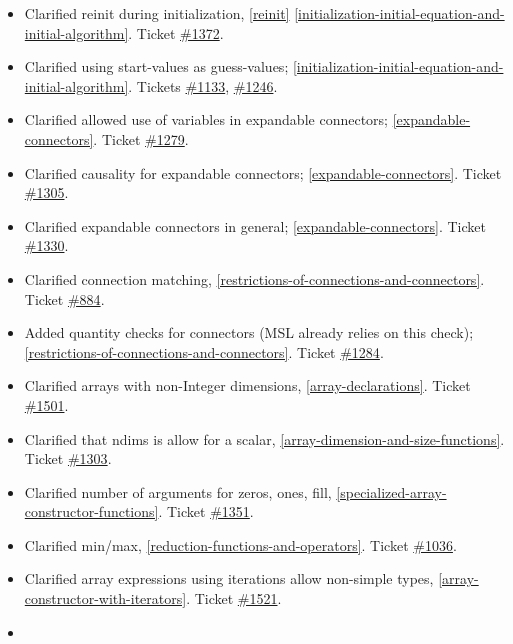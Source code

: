 \begin{itemize}
\item
  Clarified reinit during initialization, \ref{reinit} \ref{initialization-initial-equation-and-initial-algorithm}. Ticket
  \href{https://trac.modelica.org/Modelica/ticket/1372}{\#1372}.
\item
  Clarified using start-values as guess-values; \ref{initialization-initial-equation-and-initial-algorithm}. Tickets
  \href{https://trac.modelica.org/Modelica/ticket/1133}{\#1133},
  \href{https://trac.modelica.org/Modelica/ticket/1246}{\#1246}.
\item
  Clarified allowed use of variables in expandable connectors; \ref{expandable-connectors}. Ticket
  \href{https://trac.modelica.org/Modelica/ticket/1279}{\#1279}.
\item
  Clarified causality for expandable connectors; \ref{expandable-connectors}. Ticket
  \href{https://trac.modelica.org/Modelica/ticket/1305}{\#1305}.
\item
  Clarified expandable connectors in general; \ref{expandable-connectors}. Ticket
  \href{https://trac.modelica.org/Modelica/ticket/1330}{\#1330}.
\item
  Clarified connection matching, \ref{restrictions-of-connections-and-connectors}. Ticket
  \href{https://trac.modelica.org/Modelica/ticket/884}{\#884}.
\item
  Added quantity checks for connectors (MSL already relies on this
  check); \ref{restrictions-of-connections-and-connectors}. Ticket
  \href{https://trac.modelica.org/Modelica/ticket/1284}{\#1284}.
\item
  Clarified arrays with non-Integer dimensions, \ref{array-declarations}. Ticket
  \href{https://trac.modelica.org/Modelica/ticket/1501}{\#1501}.
\item
  Clarified that ndims is allow for a scalar, \ref{array-dimension-and-size-functions}. Ticket
  \href{https://trac.modelica.org/Modelica/ticket/1303}{\#1303}.
\item
  Clarified number of arguments for zeros, ones, fill, \ref{specialized-array-constructor-functions}.
  Ticket \href{https://trac.modelica.org/Modelica/ticket/1351}{\#1351}.
\item
  Clarified min/max, \ref{reduction-functions-and-operators}. Ticket
  \href{https://trac.modelica.org/Modelica/ticket/1036}{\#1036}.
\item
  Clarified array expressions using iterations allow non-simple types,
  \ref{array-constructor-with-iterators}. Ticket
  \href{https://trac.modelica.org/Modelica/ticket/1521}{\#1521}.
\item

\end{itemize}
